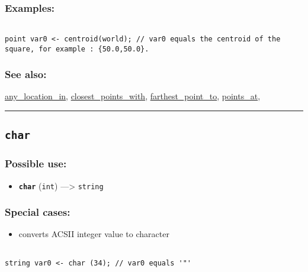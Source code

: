 \documentclass[]{book}
\providecommand{\tightlist}{%
  \setlength{\itemsep}{0pt}\setlength{\parskip}{0pt}}
\theoremstyle{definition}
\theoremstyle{definition}
\theoremstyle{definition}
\theoremstyle{remark}
\begin{document}
\subsubsection{Examples:}\label{examples-63}

\begin{verbatim}
 
point var0 <- centroid(world); // var0 equals the centroid of the square, for example : {50.0,50.0}.
\end{verbatim}

\subsubsection{See also:}\label{see-also-51}

\href{OperatorsAA\#any_location_in}{any\_location\_in},
\href{OperatorsBC\#closest_points_with}{closest\_points\_with},
\href{OperatorsDH\#farthest_point_to}{farthest\_point\_to},
\href{OperatorsNR\#points_at}{points\_at},

\begin{center}\rule{0.5\linewidth}{\linethickness}\end{center}

\subsection{\texorpdfstring{\texttt{char}}{char}}\label{char}

\subsubsection{Possible use:}\label{possible-use-82}

\begin{itemize}
\tightlist
\item
  \textbf{\texttt{char}} (\texttt{int}) ---\textgreater{}
  \texttt{string}
\end{itemize}

\subsubsection{Special cases:}\label{special-cases-27}

\begin{itemize}
\tightlist
\item
  converts ACSII integer value to character
\end{itemize}

\begin{verbatim}
 
string var0 <- char (34); // var0 equals '"'
\end{verbatim}
\end{document}
